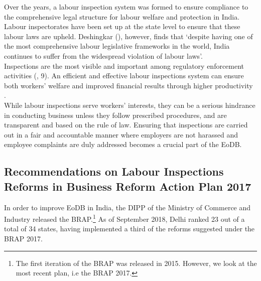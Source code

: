 \documentclass[a4paper, 12pt, twoside]{article}
\begin{document}
Over the years, a labour inspection system was formed to ensure compliance to the comprehensive legal structure for labour welfare and protection in India. Labour inspectorates have been set up at the state level to ensure that these labour laws are upheld. Deshingkar (\cite{deshingkarpaper}), however, finds that ‘despite having one of the most comprehensive labour legislative frameworks in the world, India continues to suffer from the widespread violation of labour laws’. \\

Inspections are the most visible and important among regulatory enforcement activities (\cite{oecdinspections2}, 9). An efficient and effective labour inspections system can ensure both workers’ welfare and improved financial results through higher productivity \parencite{iloreportlabour}. \\

While labour inspections serve workers’ interests, they can be a serious hindrance in conducting business unless they follow prescribed procedures, and are transparent and based on the rule of law. Ensuring that inspections are carried out in a fair and accountable manner where employers are not harassed and employee complaints are duly addressed becomes a crucial part of the EoDB.\\

\subsection{Recommendations on Labour Inspections Reforms in Business Reform Action Plan 2017}

In order to improve EoDB in India, the DIPP of the Ministry of Commerce and Industry released the BRAP.\footnote{The first iteration of the BRAP was released in 2015. However, we look at the most recent plan, i.e the BRAP 2017.} As of September 2018, Delhi ranked 23 out of a total of 34 states, having implemented a third of the reforms suggested under the BRAP 2017.\\
\end{document}
